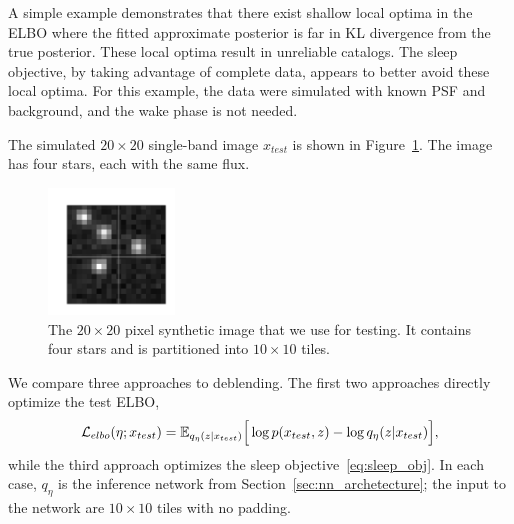 

\label{sec:elbo_sleep_compare}

A simple example demonstrates that there exist shallow local optima in the ELBO
where the fitted approximate posterior is far in KL divergence from the true posterior. 
These local optima result in unreliable catalogs. 
The sleep objective, by taking advantage of  complete data, appears to better avoid these local optima. 
For this example, the data were simulated with known PSF and background, and the wake phase is not needed. 

The simulated $20\times20$ single-band image $x_{test}$ is shown in Figure~\ref{fig:toy_example}.
The image has four stars, each with the same flux. 

\begin{figure}[!h]
    \centering
    \vspace{-1em}
    \includegraphics[width = 0.3\textwidth]{figures/vi_sleep_ex_figure.png}
    \vspace{-1.7em}
    \caption{The $20\times 20$ pixel synthetic image that we use for testing. It contains four stars and is partitioned into $10\times 10$ tiles. }
    \label{fig:toy_example}
\end{figure}

We compare three approaches to deblending. The first two approaches directly optimize the test ELBO, 
\begin{align}
\mathcal{L}_{elbo}(\eta; x_{test}) = \mathbb{E}_{q_{\eta}(z | x_{test})}\Big[\log p(x_{test}, z) - \log q_{\eta}(z | x_{test})\Big],
\label{eq:elbo_on_test}
\end{align}
while the third approach optimizes the sleep objective~\eqref{eq:sleep_obj}. 
In each case, $q_\eta$ is the inference network from Section~\ref{sec:nn_archetecture}; the input to the network are $10\times 10$ tiles with no padding. 

